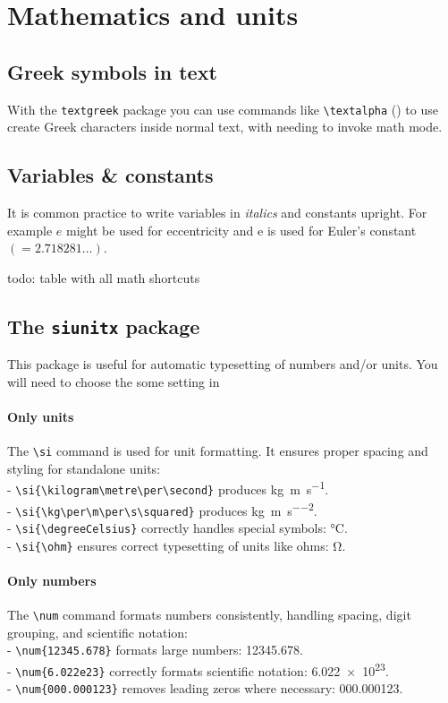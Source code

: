 \section{Mathematics and units}

\subsection{Greek symbols in text}

    With the \verb|textgreek| package you can use commands like \verb|\textalpha| (\textalpha) to use create Greek characters inside normal text, with needing to invoke math mode.

\subsection{Variables \& constants}

	It is common practice to write variables in \textit{italics} and constants upright. For example $e$ might be used for eccentricity and $\mathrm{e} $ is used for Euler's constant $(=\num{2.718281}\dots)$.

	todo: table with all math shortcuts


\subsection{The \texttt{siunitx} package}

	This package is useful for automatic typesetting of numbers and/or units. You will need to choose the some setting in %

	\paragraph*{Only units}
	The \verb|\si| command is used for unit formatting. It ensures proper spacing and styling for standalone units:  \\
	- \verb|\si{\kilogram\metre\per\second}| produces \si{\kilogram\metre\per\second}.  \\
	- \verb|\si{\kg\per\m\per\s\squared}| produces \si{\kg\per\m\per\s\squared}.  \\
	- \verb|\si{\degreeCelsius}| correctly handles special symbols: \si{\degreeCelsius}.  \\
	- \verb|\si{\ohm}| ensures correct typesetting of units like ohms: \si{\ohm}.

	\paragraph*{Only numbers}
	The \verb|\num| command formats numbers consistently, handling spacing, digit grouping, and scientific notation:  \\
	- \verb|\num{12345.678}| formats large numbers: \num{12345.678}. \\
	- \verb|\num{6.022e23}| correctly formats scientific notation: \num{6.022e23}.  \\
	- \verb|\num{000.000123}| removes leading zeros where necessary: \num{000.000123}.

